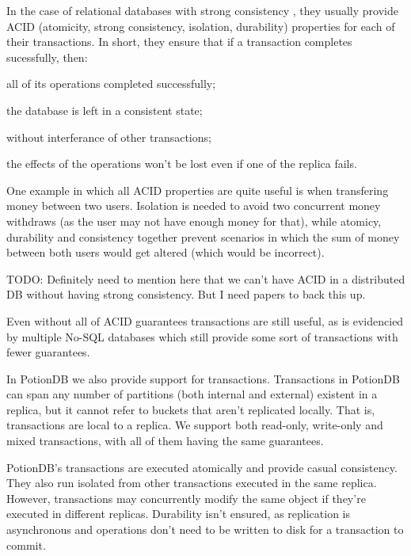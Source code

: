 \documentclass{vldb}
\newcommand{\grumbler}[2]{{\color{red}{\bf #1:} #2}}
\newcommand{\andre}[1]{\grumbler{andre}{#1}}
\begin{document}
In the case of relational databases with strong consistency \cite{???} %
, they usually provide ACID (atomicity, strong consistency, isolation, durability) properties for each of their transactions.
In short, they ensure that if a transaction completes sucessfully, then: 
\begin{enumerate*}[label=(\roman*)]
	\item all of its operations completed successfully;
	\item the database is left in a consistent state;
	\item without interferance of other transactions;
	\item the effects of the operations won't be lost even if one of the replica fails.
\end{enumerate*}
One example in which all ACID properties are quite useful is when transfering money between two users. Isolation is needed to avoid two concurrent money withdraws (as the user may not have enough money for that), while atomicy, durability and consistency together prevent scenarios in which the sum of money between both users would get altered (which would be incorrect).

\andre{TODO: Definitely need to mention here that we can't have ACID in a distributed DB without having strong consistency. But I need papers to back this up.} %

Even without all of ACID guarantees transactions are still useful, as is evidencied by multiple No-SQL databases which still provide some sort of transactions \cite{???} with fewer guarantees. %

In PotionDB we also provide support for transactions. 
Transactions in PotionDB can span any number of partitions (both internal and external) existent in a replica, but it cannot refer to buckets that aren't replicated locally.
That is, transactions are local to a replica.
We support both read-only, write-only and mixed transactions, with all of them having the same guarantees.

PotionDB's transactions are executed atomically and provide casual consistency. 
They also run isolated from other transactions executed in the same replica. 
However, transactions may concurrently modify the same object if they're executed in different replicas.
Durability isn't ensured, as replication is asynchronous and operations don't need to be written to disk for a transaction to commit. %
\end{document}
